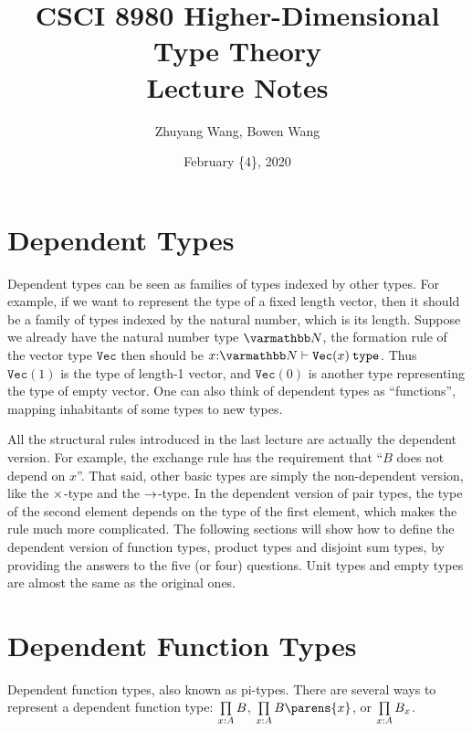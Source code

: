 \documentclass[11pt]{article}
\title{CSCI 8980 Higher-Dimensional Type Theory\\ Lecture Notes}
\author{Zhuyang Wang, Bowen Wang}
\date{February \{4\}, 2020}
\begin{document}
\maketitle

\section{Dependent Types}
Dependent types can be seen as families of types indexed by other types. For example, if we want to represent the type of a fixed length vector, then it should be a family of types indexed by the natural number, which is its length. Suppose we already have the natural number type $\nattype$, the formation rule of the vector type $\mathtt{Vec}$ then should be $\istype{x{:}\nattype}{\mathtt{Vec}(x)}$. Thus $\mathtt{Vec}(1)$ is the type of length-1 vector, and $\mathtt{Vec}(0)$ is another type representing the type of empty vector. One can also think of dependent types as ``functions'', mapping inhabitants of some types to new types.

All the structural rules introduced in the last lecture are actually the dependent version. For example, the exchange rule has the requirement that ``$B$ does not depend on $x$''. That said, other basic types are simply the non-dependent version, like the $\pairtype$-type and the $\funtype$-type. In the dependent version of pair types, the type of the second element depends on the type of the first element, which makes the rule much more complicated. The following sections will show how to define the dependent version of function types, product types and disjoint sum types, by providing the answers to the five (or four) questions. Unit types and empty types are almost the same as the original ones.

\section{Dependent Function Types}
Dependent function types, also known as pi-types. There are several ways to represent a dependent function type: $\dfuntype{x}{A}{B}$, $\dfuntype{x}{A}{B\parens{x}}$, or $\dfuntype{x}{A}{B_x}$.
\end{document}
